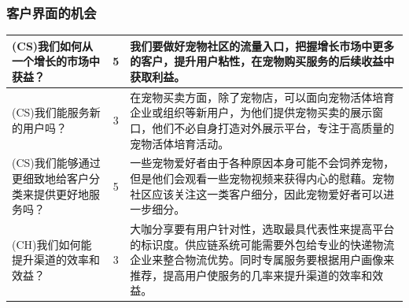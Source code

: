 \documentclass[a4paper]{ctexart}
\begin{document}
\FloatBarrier
\subsubsection{客户界面的机会}
\begin{table}[h]
  \centering
\begin{tabular}{|p{3.5cm}|c|p{10cm}|}
  \hline
  (CS)我们如何从一个增长的市场中获益？ & 5 & 我们要做好宠物社区的流量入口，把握增长市场中更多的客户，提升用户粘性，在宠物购买服务的后续收益中获取利益。\\
  \hline
  (CS)我们能服务新的用户吗？ & 3 & 在宠物买卖方面，除了宠物店，可以面向宠物活体培育企业或组织等新用户，为他们提供宠物买卖的展示窗口，他们不必自身打造对外展示平台，专注于高质量的宠物活体培育活动。\\
  \hline
  (CS)我们能够通过更细致地给客户分类来提供更好地服务吗？ & 5 & 一些宠物爱好者由于各种原因本身可能不会饲养宠物，但是他们会观看一些宠物视频来获得内心的慰藉。宠物社区应该关注这一类客户细分，因此宠物爱好者可以进一步细分。\\
  \hline
  (CH)我们如何能提升渠道的效率和效益？ & 3 & 大咖分享要有用户针对性，选取最具代表性来提高平台的标识度。供应链系统可能需要外包给专业的快递物流企业来整合物流优势。同时专属服务要根据用户画像来推荐，提高用户使服务的几率来提升渠道的效率和效益。\\
  \hline
\end{tabular}
\end{table}
\end{document}
